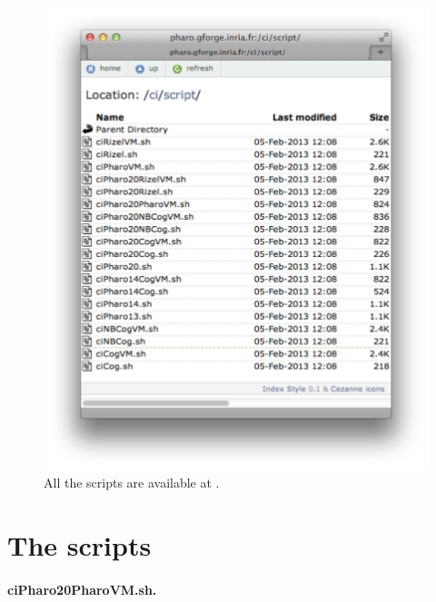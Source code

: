 \documentclass[a4paper,10pt,twoside]{book}
\begin{document}
\begin{figure}[!h]
	\centering
	\includegraphics[width=\textwidth]{webSite}
	\caption{All the scripts are available at  \label{fig:website}.}
\end{figure}


\section{The scripts}

	



\paragraph{ciPharo20PharoVM.sh.}
\end{document}
